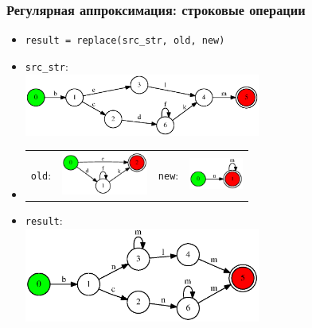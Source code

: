 \documentclass{beamer}
\begin{document}
\begin{frame}[fragile]
	\transwipe[direction=90]
	\frametitle{Регулярная аппроксимация: строковые операции}
	\begin{itemize}
		\item \verb|result = replace(src_str, old, new)|		
 		\item \verb|src_str|: 
 		\\
    \includegraphics[width=220pt]{picts/fsa1.eps}
    \item
    \begin{tabular}[t t t t]{l l l l }
     \verb|old|:
      &
       \includegraphics[width=80pt]{picts/fsa2.eps}
 		&
     \verb|new|:
        &
          \includegraphics[width=50pt]{picts/fsa3.eps}

    \end{tabular}
		\item \verb|result|:
    \\
    \includegraphics[width=220pt]{picts/replace_example.eps}

	\end{itemize}
\end{frame}
\end{document}
